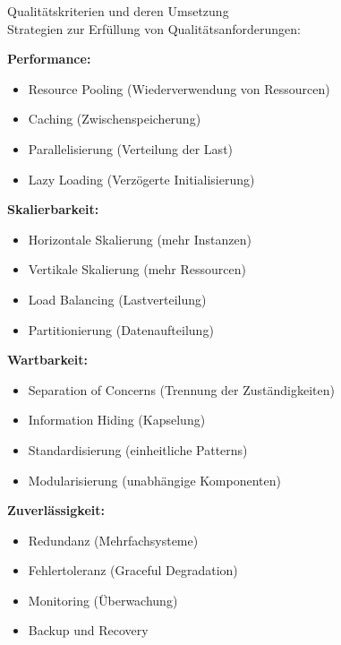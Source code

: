 \begin{theorem}{Qualitätskriterien und deren Umsetzung}\\
Strategien zur Erfüllung von Qualitätsanforderungen:

\textbf{Performance:}
\begin{itemize}
    \item Resource Pooling (Wiederverwendung von Ressourcen)
    \item Caching (Zwischenspeicherung)
    \item Parallelisierung (Verteilung der Last)
    \item Lazy Loading (Verzögerte Initialisierung)
\end{itemize}

\textbf{Skalierbarkeit:}
\begin{itemize}
    \item Horizontale Skalierung (mehr Instanzen)
    \item Vertikale Skalierung (mehr Ressourcen)
    \item Load Balancing (Lastverteilung)
    \item Partitionierung (Datenaufteilung)
\end{itemize}

\textbf{Wartbarkeit:}
\begin{itemize}
    \item Separation of Concerns (Trennung der Zuständigkeiten)
    \item Information Hiding (Kapselung)
    \item Standardisierung (einheitliche Patterns)
    \item Modularisierung (unabhängige Komponenten)
\end{itemize}

\textbf{Zuverlässigkeit:}
\begin{itemize}
    \item Redundanz (Mehrfachsysteme)
    \item Fehlertoleranz (Graceful Degradation)
    \item Monitoring (Überwachung)
    \item Backup und Recovery
\end{itemize}
\end{theorem}

